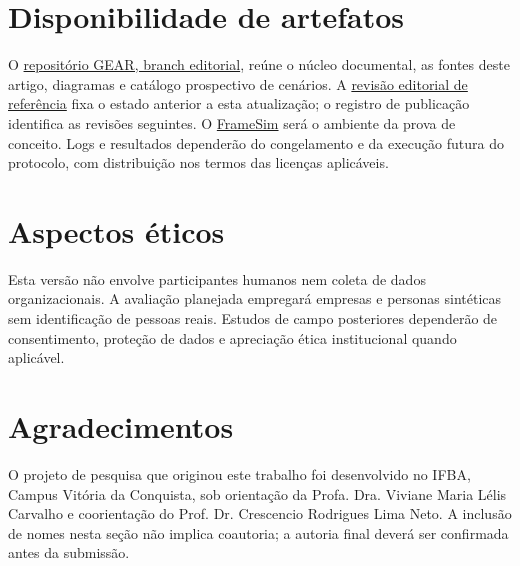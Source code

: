 \documentclass[11pt,a4paper]{article}
\begin{document}
\section*{Disponibilidade de artefatos}
O \href{https://github.com/andrecodexvictor/GP-Pme/tree/codex/gear-editorial}{repositório GEAR, branch editorial}, reúne o núcleo documental, as fontes deste artigo, diagramas e catálogo prospectivo de cenários. A \href{https://github.com/andrecodexvictor/GP-Pme/tree/8386586af110ba2112694a8ee6dd7b9d94d20572}{revisão editorial de referência} fixa o estado anterior a esta atualização; o registro de publicação identifica as revisões seguintes. O \href{https://github.com/andrecodexvictor/Frame-sim}{FrameSim} será o ambiente da prova de conceito. Logs e resultados dependerão do congelamento e da execução futura do protocolo, com distribuição nos termos das licenças aplicáveis.

\section*{Aspectos éticos}
Esta versão não envolve participantes humanos nem coleta de dados organizacionais. A avaliação planejada empregará empresas e personas sintéticas sem identificação de pessoas reais. Estudos de campo posteriores dependerão de consentimento, proteção de dados e apreciação ética institucional quando aplicável.

\section*{Agradecimentos}
O projeto de pesquisa que originou este trabalho foi desenvolvido no IFBA, Campus Vitória da Conquista, sob orientação da Profa. Dra. Viviane Maria Lélis Carvalho e coorientação do Prof. Dr. Crescencio Rodrigues Lima Neto. A inclusão de nomes nesta seção não implica coautoria; a autoria final deverá ser confirmada antes da submissão.





\end{document}
